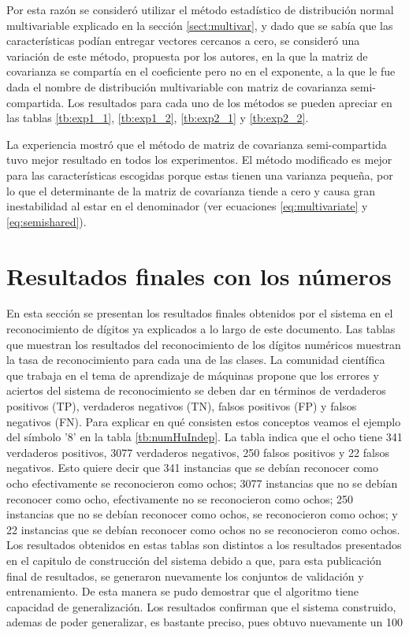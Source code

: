 \documentclass[a4paper, 11pt, oneside]{report}
\begin{document}
Por esta razón se consideró utilizar el método estadístico de distribución normal multivariable explicado en la sección \ref{sect:multivar}, y dado que se sabía que las características podían entregar vectores cercanos a cero, se consideró una variación de este método, propuesta por los autores, en la que la matriz de covarianza se compartía en el coeficiente pero no en el exponente, a la que le fue dada el nombre de distribución multivariable con matriz de covarianza semi-compartida. Los resultados para cada uno de los métodos se pueden apreciar en las tablas \ref{tb:exp1_1}, \ref{tb:exp1_2}, \ref{tb:exp2_1} y \ref{tb:exp2_2}.

La experiencia mostró que el método de matriz de covarianza semi-compartida tuvo mejor resultado en todos los experimentos. El método modificado es mejor para las características escogidas porque estas tienen una varianza pequeña, por lo que el determinante de la matriz de covarianza tiende a cero y causa gran inestabilidad al estar en el denominador (ver ecuaciones \ref{eq:multivariate} y \ref{eq:semishared}).

\section{Resultados finales con los números}

En esta sección se presentan los resultados finales obtenidos por el sistema en el reconocimiento de dígitos ya explicados a lo largo de este documento. Las tablas que muestran los resultados del reconocimiento de los dígitos numéricos muestran la tasa de reconocimiento para cada una de las clases. La comunidad científica que trabaja en el tema de aprendizaje de máquinas propone que los errores y aciertos del sistema de reconocimiento se deben dar en términos de verdaderos positivos (TP), verdaderos negativos (TN), falsos positivos (FP) y falsos negativos (FN). Para explicar en qué consisten estos conceptos veamos el ejemplo del símbolo '8' en la tabla \ref{tb:numHuIndep}. La tabla indica que el ocho tiene 341 verdaderos positivos, 3077 verdaderos negativos, 250 falsos positivos y 22 falsos negativos. Esto quiere decir que 341 instancias que se debían reconocer como ocho efectivamente se reconocieron como ochos; 3077 instancias que no se debían reconocer como ocho, efectivamente no se reconocieron como ochos; 250 instancias que no se debían reconocer como ochos, se reconocieron como ochos; y 22 instancias que se debían reconocer como ochos no se reconocieron como ochos. Los resultados obtenidos en estas tablas son distintos a los resultados presentados en el capitulo de construcción del sistema debido a que, para esta publicación final de resultados, se generaron nuevamente los conjuntos de validación y entrenamiento. De esta manera se pudo demostrar que el algoritmo tiene capacidad de generalización. Los resultados confirman que el sistema construido, ademas de poder generalizar, es bastante preciso, pues obtuvo nuevamente un 100%
\end{document}
